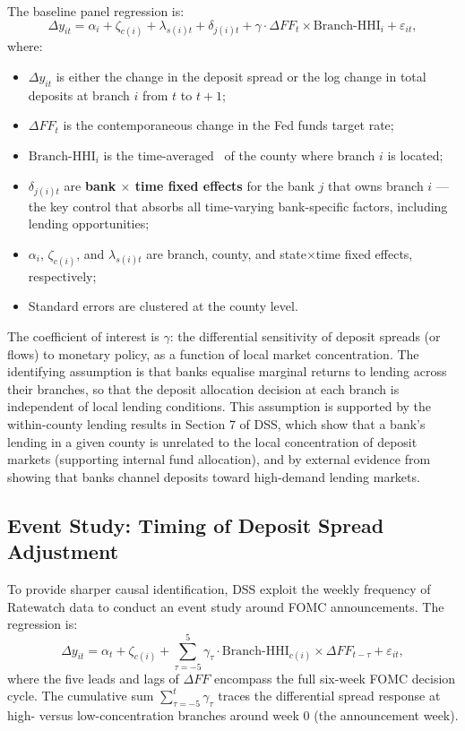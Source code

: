 \documentclass[12pt,a4paper]{article}
\newcommand{\HHI}{\text{HHI}}
\begin{document}
The baseline panel regression is:
\begin{equation}
  \Delta y_{it} = \alpha_i + \zeta_{c(i)} + \lambda_{s(i)t}
  + \delta_{j(i)t} + \gamma \cdot \Delta FF_t
  \times \text{Branch-HHI}_i + \varepsilon_{it},
  \label{eq:main_reg}
\end{equation}
where:
\begin{itemize}
  \item $\Delta y_{it}$ is either the change in the deposit spread or the log
    change in total deposits at branch $i$ from $t$ to $t+1$;
  \item $\Delta FF_t$ is the contemporaneous change in the Fed funds target
    rate;
  \item $\text{Branch-HHI}_i$ is the time-averaged \HHI\ of the county where
    branch $i$ is located;
  \item $\delta_{j(i)t}$ are \textbf{bank $\times$ time fixed effects} for the
    bank $j$ that owns branch $i$ --- the key control that absorbs all
    time-varying bank-specific factors, including lending opportunities;
  \item $\alpha_i$, $\zeta_{c(i)}$, and $\lambda_{s(i)t}$ are branch, county,
    and state$\times$time fixed effects, respectively;
  \item Standard errors are clustered at the county level.
\end{itemize}

The coefficient of interest is $\gamma$: the differential sensitivity of
deposit spreads (or flows) to monetary policy, as a function of local market
concentration. The identifying assumption is that banks equalise marginal
returns to lending across their branches, so that the deposit allocation
decision at each branch is independent of local lending conditions. This
assumption is supported by the within-county lending results in Section 7 of
DSS, which show that a bank's lending in a given county is unrelated to the
local concentration of deposit markets (supporting internal fund allocation),
and by external evidence from \citet{gilje_loutskina_strahan_2016} showing
that banks channel deposits toward high-demand lending markets.

\subsection{Event Study: Timing of Deposit Spread Adjustment}

To provide sharper causal identification, DSS exploit the weekly frequency of
Ratewatch data to conduct an event study around FOMC announcements. The
regression is:
\begin{equation}
  \Delta y_{it} = \alpha_t + \zeta_{c(i)} + \sum_{\tau=-5}^{5}
  \gamma_\tau \cdot \text{Branch-HHI}_{c(i)} \times \Delta FF_{t-\tau}
  + \varepsilon_{it},
  \label{eq:event_study}
\end{equation}
where the five leads and lags of $\Delta FF$ encompass the full six-week FOMC
decision cycle. The cumulative sum $\sum_{\tau=-5}^{t} \gamma_\tau$ traces
the differential spread response at high- versus low-concentration branches
around week 0 (the announcement week).
\end{document}
